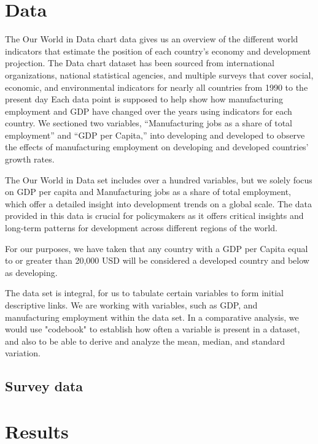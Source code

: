 \documentclass[12pt]{article}
\begin{document}
\section{Data}
\label{sec:data}


The Our World in Data chart data gives us an overview of the different world indicators that estimate the position of each country's economy and development projection. The Data chart dataset has been sourced from international organizations, national statistical agencies, and multiple surveys that cover social, economic, and environmental indicators for nearly all countries from 1990 to the present day Each data point is supposed to help show how manufacturing employment and GDP have changed over the years using indicators for each country. We sectioned two variables, ``Manufacturing jobs as a share of total employment'' and ``GDP per Capita,'' into developing and developed to observe the effects of manufacturing employment on developing and developed countries' growth rates.

The Our World in Data set includes over a hundred variables, but we solely focus on GDP per capita and Manufacturing jobs as a share of total employment, which offer a detailed insight into development trends on a global scale. The data provided in this data is crucial for policymakers as it offers critical insights and long-term patterns for development across different regions of the world.

For our purposes, we have taken that any country with a GDP per Capita equal to or greater than 20,000 USD will be considered a developed country and below as developing. 


The data set is integral, for us to tabulate certain variables to form initial descriptive links. We are working with variables, such as GDP, and manufacturing employment within the data set. In a comparative analysis, we would use "codebook" to establish how often a variable is present in a dataset, and also to be able to derive and analyze the mean, median, and standard variation.



\subsection{Survey data}

\section{Results}
\label{sec:result}
\end{document}

